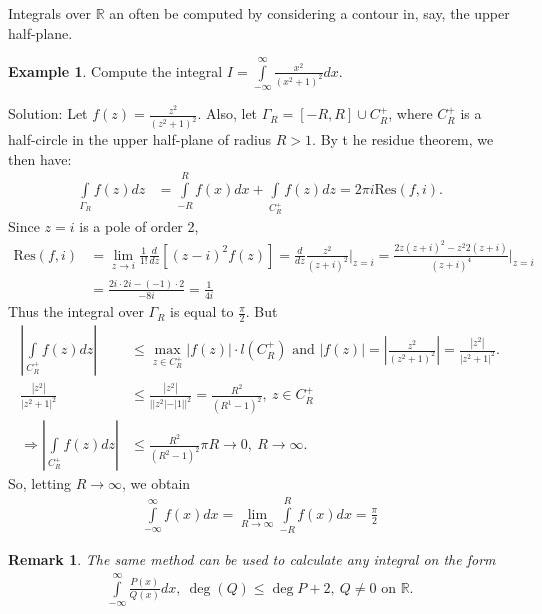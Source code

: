\documentclass[12pt, a4paper]{article}
\theoremstyle{plain}
\newtheorem{rem}{Remark}
\theoremstyle{definition}
\newtheorem{example}{Example} %
\begin{document}
			Integrals over $\mathbb{R}$ an often be computed by considering a contour in, say, the upper half-plane.\\

			\begin{example}
				Compute the integral $I=\int\limits_{-\infty}^{\infty}\frac{x^2}{(x^2+1)^2}dx.$

				Solution: Let $f(z) = \frac{z^2}{(z^2+1)^2}$. Also, let $\Gamma_R = [-R,R]\cup C_R^+$, where $C_R^+$ is a half-circle in the upper half-plane of radius $R>1$. By t he residue theorem, we then have:
				\begin{align*}
					\int\limits_{\Gamma_R}f(z)dz &= \int\limits_{-R}^{R}f(x)dx + \int\limits_{C_R^+}f(z)dz = 2\pi i \mathrm{Res}(f,i).
				\end{align*}
				Since $z=i$ is a pole of order 2,
				\begin{align*}
					\mathrm{Res}(f,i) &= 
					\lim\limits_{z\to i}\frac{1}{1!}\frac{d}{dz}[(z-i)^2f(z)] =
					\frac{d}{dz}\frac{z^2}{(z+i)^2}\Bigg|_{z=i} =
					\frac{2z(z+i)^2-z^2 2(z+i)}{(z+i)^4}\Bigg|_{z=i}\\ &=
					\frac{2i\cdot 2i -(-1)\cdot 2}{-8i} = \frac{1}{4i}
				\end{align*}
				Thus  the integral over $\Gamma_R$ is equal to $\frac{\pi}{2}$. But
				\begin{align*}
					\left|\int\limits_{C_R^+}f(z)dz\right| &\le \max\limits_{z\in C_R^+}|f(z)|\cdot l(C_R^+) 
					\text{ and }
					|f(z)| = \left|\frac{z^2}{(z^2+1)^2}\right| = \frac{|z^2|}{|z^2+1|^2}.\\
					\frac{|z^2|}{|z^2+1|^2} &\le \frac{|z^2|}{||z^2|-|1||^2} = \frac{R^2}{(R^1-1)^2},\:z\in C_R^+\\
					\Rightarrow \left|\int\limits_{C_R^+}f(z)dz\right| &\le \frac{R^2}{(R^2-1)^2}\pi R \to 0,\:R\to\infty.
				\end{align*}
				So, letting $R\to\infty$, we obtain
				\begin{align*}
					\int\limits_{-\infty}^{\infty}f(x)dx = 
					\lim\limits_{R\to\infty}\int\limits_{-R}^{R}f(x)dx = \frac{\pi}{2}
				\end{align*}
			\end{example}

			\begin{rem}
				The same method can be used to calculate any integral on the form
				\begin{align*}
					\int\limits_{-\infty}^{\infty}\frac{P(x)}{Q(x)}dx,\:\deg(Q)\le\deg{P}+2,\:Q\not=0\text{ on }\mathbb{R}.
				\end{align*}
			\end{rem}
\end{document}
